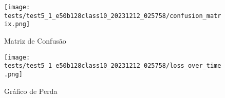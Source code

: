 \begin{figure}[ht]
 \begin{center}
   \texttt{[image: tests/test5\_1\_e50b128class10\_20231212\_025758/confusion\_matrix.png]}
  \caption{Matriz de Confusão}
  \label{fig:fig03}
 \end{center}
\end{figure}

\begin{figure}[ht]
 \begin{center}
   \texttt{[image: tests/test5\_1\_e50b128class10\_20231212\_025758/loss\_over\_time.png]}
  \caption{Gráfico de Perda}
  \label{fig:fig04}
 \end{center}
\end{figure}
